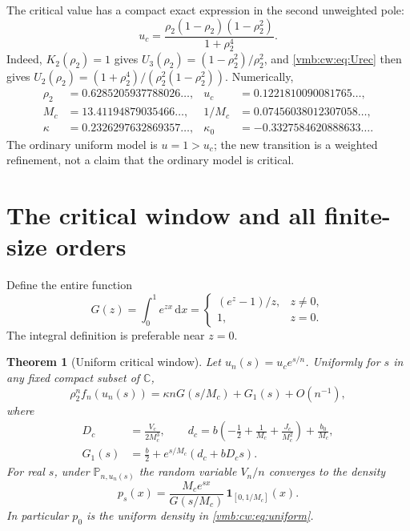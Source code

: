 \documentclass[11pt,a4paper]{article}
\numberwithin{equation}{section}
\newtheorem{theorem}{Theorem}[section]
\theoremstyle{definition}\newtheorem{definition}[theorem]{Definition}
\theoremstyle{remark}\newtheorem{remark}[theorem]{Remark}
\newcommand{\C}{\mathbb C}
\newcommand{\Prob}{\mathbb P}
\newcommand{\dd}{\mathrm d}
\begin{document}
The critical value has a compact exact expression in the second unweighted
pole:
\begin{equation}\label{vmb:cw:eq:ucclosed}
 \boxed{\displaystyle
 u_c=\frac{\rho_2(1-\rho_2)(1-\rho_2^2)}{1+\rho_2^4}.}
\end{equation}
Indeed, $K_2(\rho_2)=1$ gives $U_3(\rho_2)=(1-\rho_2^2)/\rho_2^2$, and
\eqref{vmb:cw:eq:Urec} then gives
$U_2(\rho_2)=(1+\rho_2^4)/(\rho_2^2(1-\rho_2^2))$.
Numerically,
\begin{align*}
 \rho_2&=0.6285205937788026\ldots,&u_c&=0.1221810090081765\ldots,\\
 M_c&=13.41194879035466\ldots,&1/M_c&=0.07456038012307058\ldots,\\
 \kappa&=0.2326297632869357\ldots,&
 \kappa_0&=-0.3327584620888633\ldots.
\end{align*}
The ordinary uniform model is $u=1>u_c$; the new transition is a weighted
refinement, not a claim that the ordinary model is critical.

\section{The critical window and all finite-size orders}
\label{vmb:cw:sec:window}
Define the entire function
\begin{equation}\label{vmb:cw:eq:G}
 G(z)=\int_0^1e^{zx}\,\dd x
 =\begin{cases}(e^z-1)/z,&z\ne0,\\1,&z=0.\end{cases}
\end{equation}
The integral definition is preferable near $z=0$.

\begin{theorem}[Uniform critical window]\label{vmb:cw:thm:window}
Let $u_n(s)=u_c e^{s/n}$. Uniformly for $s$ in any fixed compact subset
of $\C$,
\begin{equation}\label{vmb:cw:eq:window}
 \rho_2^nf_n(u_n(s))=\kappa nG(s/M_c)+G_1(s)+O(n^{-1}),
\end{equation}
where
\begin{align}
 D_c&=\frac{V_c}{2M_c^3},\qquad
 d_c=b\left(-\frac12+\frac1{M_c}+\frac {J_c}{M_c^2}\right)+\frac{b_0}{M_c},
 \label{vmb:cw:eq:Dd}\\
 G_1(s)&=\frac b2+e^{s/M_c}(d_c+bD_cs).\label{vmb:cw:eq:C0}
\end{align}
For real $s$, under $\Prob_{n,u_n(s)}$ the random variable $V_n/n$ converges
to the density
\begin{equation}\label{vmb:cw:eq:tiltdensity}
 p_s(x)=\frac{M_c e^{sx}}{G(s/M_c)}\,
 \mathbf1_{[0,1/M_c]}(x).
\end{equation}
In particular $p_0$ is the uniform density in \eqref{vmb:cw:eq:uniform}.
\end{theorem}
\end{document}
